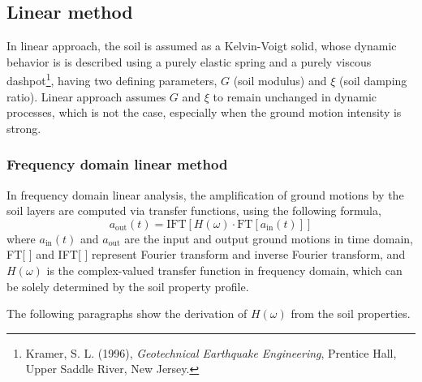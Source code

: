 \documentclass[11pt,letterpaper]{article}
\begin{document}
\subsection{Linear method}\label{sec:linear}

In linear approach, the soil is assumed as a Kelvin-Voigt solid, whose dynamic behavior is is described using a purely elastic spring and a purely viscous dashpot\footnote{Kramer, S. L. (1996), \emph{Geotechnical Earthquake Engineering}, Prentice Hall, Upper Saddle River, New Jersey.}, having two defining parameters, $G$ (soil modulus) and $\xi$ (soil damping ratio). Linear approach assumes $G$ and $\xi$ to remain unchanged in dynamic processes, which is not the case, especially when the ground motion intensity is strong.

\subsubsection{Frequency domain linear method}

In frequency domain linear analysis, the amplification of ground motions by the soil layers are computed via transfer functions, using the following formula,
\begin{equation}\label{eq:freq-domain-amplification}
    a_{\text{out}}\left(t\right)=\text{IFT}\left[H\left(\omega\right)\cdot\text{FT}\left[a_{\text{in}}(t)\right]\right]
\end{equation}
where $a_{\text{in}}(t)$ and $a_{\text{out}}$ are the input and output ground motions in time domain, FT[ ] and IFT[ ] represent Fourier transform and inverse Fourier transform, and $H(\omega)$ is the complex-valued transfer function in frequency domain, which can be solely determined by the soil property profile.

The following paragraphs show the derivation of $H(\omega)$ from the soil properties.
\end{document}
